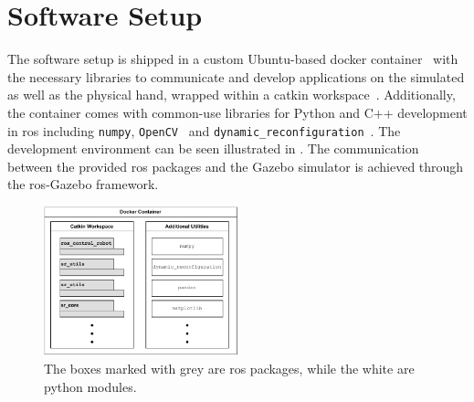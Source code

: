 \section{Software Setup} \label{sec:system-setup-software-setup}

The software setup is shipped in a custom Ubuntu-based docker container~\cite{docker, ubuntu-docker-image} with the necessary libraries to communicate and develop applications on the simulated as well as the physical hand, wrapped within a catkin workspace~\cite{catkin}. Additionally, the container comes with common-use libraries for Python and C++ development in \gls{ros} including \texttt{numpy}\cite{numpy}, \texttt{OpenCV}~\cite{opencv} and \texttt{dynamic\_reconfiguration}~\cite{dynamic-reconfiguration}. The development environment can be seen illustrated in . The communication between the provided \gls{ros} packages and the Gazebo simulator is achieved through the \gls{ros}-Gazebo framework. 

\begin{figure}[h]
	\begin{small}
		\begin{center}
			\includegraphics[width=0.5\textwidth]{chapters/system-setup/fig/init-package-diagram.pdf}
		\end{center}
		\caption{The boxes marked with grey are \gls{ros} packages, while the white are python modules.}
		\label{fig:package-diagram}
	\end{small}
\end{figure}

